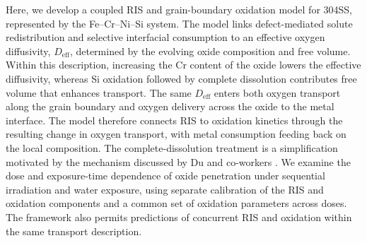 \documentclass[12pt]{article}
\begin{document}
Here, we develop a coupled RIS and grain-boundary oxidation model for
304SS, represented by the Fe--Cr--Ni--Si system. The model links
defect-mediated solute redistribution and selective interfacial
consumption to an effective oxygen diffusivity, \(D_{\mathrm{eff}}\),
determined by the evolving oxide composition and free volume. Within
this description, increasing the Cr content of the oxide lowers the
effective diffusivity, whereas Si oxidation followed by complete
dissolution contributes free volume that enhances transport. The same
\(D_{\mathrm{eff}}\) enters both oxygen transport along the grain boundary
and oxygen delivery across the oxide to the metal interface. The model
therefore connects RIS to oxidation kinetics through the resulting change
in oxygen transport, with metal consumption feeding back on the local
composition. The complete-dissolution treatment is a simplification
motivated by the mechanism discussed by Du and co-workers
\cite{du2026silicon}. We examine the dose and exposure-time dependence of
oxide penetration under sequential irradiation and water exposure, using
separate calibration of the RIS and oxidation components and a common
set of oxidation parameters across doses. The framework also permits
predictions of concurrent RIS and oxidation within the same transport
description.

\printbibliography
\end{document}
